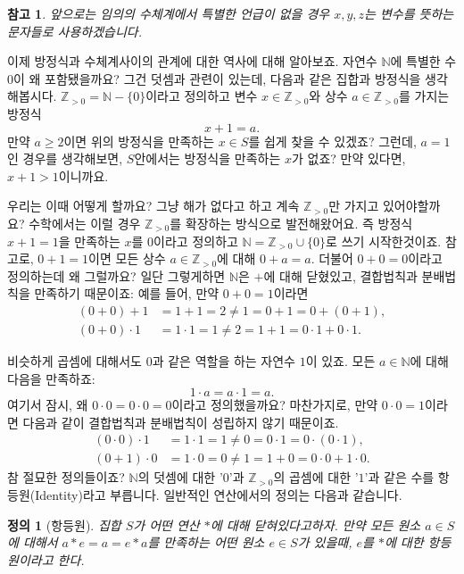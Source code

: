 \documentclass[a4paper, 11pt]{report}
\renewcommand{\<}{\langle}
\renewcommand{\>}{\rangle}
\newtheorem{dfn}[thm]{정의}
\newtheorem{remark}[thm]{참고}
\begin{document}
\begin{remark}
  앞으로는 임의의 수체계에서 특별한 언급이 없을 경우 $x, y, z$는 변수를 뜻하는 문자들로 사용하겠습니다. 
\end{remark}

이제 방정식과 수체계사이의 관계에 대한 역사에 대해 알아보죠. 자연수 $\mathbb{N}$에 특별한 수 $0$이 왜 
포함됐을까요? 그건 덧셈과 관련이 있는데, 다음과 같은 집합과 방정식을 생각해봅시다. $\mathbb{Z}_{>0} = \mathbb{N} - \{0\}$이라고
정의하고 변수 $x \in \mathbb{Z}_{>0}$와 상수 $a \in \mathbb{Z}_{>0}$를 가지는 방정식
$$
x + 1 = a.
$$
만약 $a \ge 2$이면 위의 방정식을 만족하는 $x \in S$를 쉽게 찾을 수 있겠죠? 그런데, $a = 1$인 경우를 생각해보면,
$S$안에서는 방정식을 만족하는 $x$가 없죠? 만약 있다면, $x + 1 > 1$이니까요. 

우리는 이때 어떻게 할까요? 그냥 해가 없다고 하고 계속 $\mathbb{Z}_{>0}$만 가지고 있어야할까요? 
수학에서는 이럴 경우 $\mathbb{Z}_{>0}$를 확장하는 방식으로 발전해왔어요. 즉 방정식 
$x + 1 = 1$을 만족하는 $x$를 $0$이라고 정의하고 $\mathbb{N} = \mathbb{Z}_{>0} \cup \{0\}$로 쓰기 
시작한것이죠. 참고로, $0 + 1 = 1$이면 모든 상수 $a \in \mathbb{Z}_{>0}$에 대해 $0 + a = a$. 
더불어 $0 + 0 = 0$이라고 정의하는데 왜 그럴까요? 일단 그렇게하면 $\mathbb{N}$은 $+$에 대해 닫혔있고, 
결합법칙과 분배법칙을 만족하기 때문이죠: 예를 들어, 만약 $0 + 0 = 1$이라면
\begin{align*}
    (0 + 0) + 1 &= 1 + 1 = 2 \neq 1 = 0 + 1 = 0 + (0 + 1),\\
    (0 + 0) \cdot 1 &= 1 \cdot 1 = 1 \neq 2 = 1 + 1 = 0 \cdot 1 + 0 \cdot 1.
\end{align*}

비슷하게 곱셈에 대해서도 $0$과 같은 역할을 하는 자연수 $1$이 있죠. 모든 $a \in \mathbb{N}$에 대해 다음을
만족하죠:
$$
1\cdot a = a \cdot 1 = a.
$$
여기서 잠시, 왜 $0\cdot 0 = 0 \cdot 0 = 0$이라고 정의했을까요? 마찬가지로, 만약 $0\cdot 0 = 1$이라면
다음과 같이 결합법칙과 분배법칙이 성립하지 않기 때문이죠.
\begin{align*}
  (0 \cdot 0) \cdot 1 &= 1 \cdot 1 = 1 \neq 0 = 0 \cdot 1 = 0 \cdot (0 \cdot 1),\\
  (0 + 1) \cdot 0 &= 1 \cdot 0 = 0 \neq 1 = 1 + 0 = 0 \cdot 0 + 1 \cdot 0.
\end{align*}
참 절묘한 정의들이죠? $\mathbb{N}$의 덧셈에 대한 '$0$'과 $\mathbb{Z}_{>0}$의 곱셈에 대한 '$1$'과 
같은 수를 항등원(Identity)라고 부릅니다. 일반적인 연산에서의 정의는 다음과 같습니다.

\begin{dfn}[항등원] 집합 $S$가 어떤 연산 $*$에 대해 닫혀있다고하자. 만약 모든 원소 $a \in S$에 대해서
  $a*e = a = e*a$를 만족하는 어떤 원소 $e \in S$가 있을때, $e$를 $*$에 대한 항등원이라고 한다.
\end{dfn}
\end{document}
